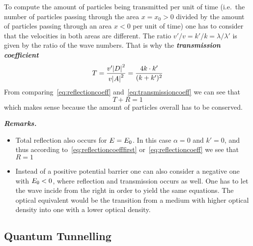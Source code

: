 \documentclass[../../script.tex]{subfiles}
\begin{document}
To compute the amount of particles being transmitted per unit of time (i.e.\ the number of particles passing through the area $x = x_0 > 0$ divided by the amount of particles passing through an area $x < 0$ per unit of time)
one has to consider that the velocities in both areas are different.
The ratio $v' / v = k' / k = \lambda / \lambda'$ is given by the ratio of the wave numbers. That is why the \textbf{\textit{transmission coefficient}}
\begin{equation}\label{eq:transmissioncoeff}
	T = \frac{v' \abs{D}^2}{v \abs{A}^2} = \frac{4k \cdot k'}{(k + k')^2}
\end{equation}
From comparing~\eqref{eq:reflectioncoeff} and~\eqref{eq:transmissioncoeff} we can see that 
\[
	T + R = 1	
\]
which makes sense because the amount of particles overall has to be conserved.

\textbf{\textit{Remarks.}}
\begin{itemize}
	\item Total reflection also occurs for $E = E_{\text{0}}$. In this case $\alpha = 0$ and $k' = 0$, and thus according to~\eqref{eq:reflectioncoefffirst} or~\eqref{eq:reflectioncoeff} we see that $R = 1$
	\item Instead of a positive potential barrier one can also consider a negative one with $E_{\text{0}} < 0$, where reflection and transmission occurs as well. 
	One has to let the wave incide from the right in order to yield the same equations. The optical equivalent would be the transition from a medium with higher optical density into one with a lower optical density.
\end{itemize}

\subsection{Quantum Tunnelling}
\end{document}
